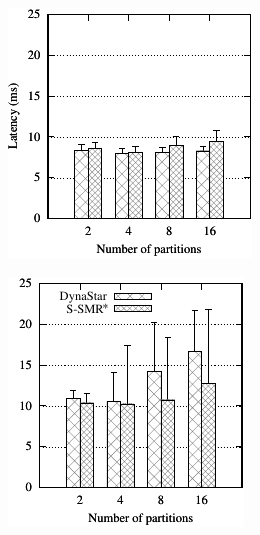 \begin{figure}[h!]
\begin{subfigure}{.38\textwidth}
  \end{subfigure}
  \begin{subfigure}{.39\textwidth}
    \centering
    \includegraphics[width=\textwidth]{./figures/eurosys/chirper-compare-timeline-lat.pdf}
  \end{subfigure}
  \begin{subfigure}{.38\textwidth}
    \centering
    \includegraphics[width=\textwidth]{./figures/eurosys/chirper-compare-mix-lat.pdf}

\end{subfigure}
\end{figure}
